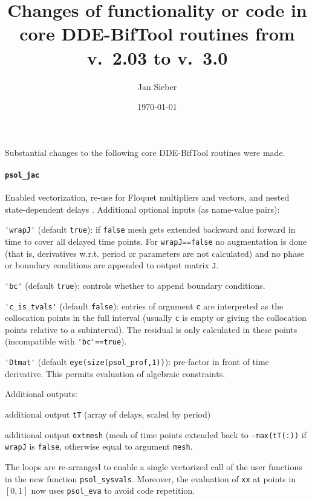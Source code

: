 \documentclass[11pt]{scrartcl}
\title{Changes of functionality or code in core DDE-BifTool
  routines from v.~2.03 to v.~3.0}
\author{Jan Sieber}\date{\today}
\newcommand{\mlvar}[1]{\lstinline[keywordstyle=\color{var}]!#1!}
\newcommand{\blist}[1]{\mbox{\lstinline!#1!}}
\begin{document}
\maketitle
Substantial changes to the following core DDE-BifTool
\cite{ELS01,ELR02,homoclinic,RS07,VLR08} routines were
made. %

\paragraph{\blist{psol_jac}}
Enabled vectorization, re-use for Floquet multipliers and vectors, and
nested state-dependent delays \cite{S13}. Additional optional inputs (as
name-value pairs):
\begin{compactitem}
\item \blist{'wrapJ'} (default \blist{true}): if \blist{false} mesh
  gets extended backward and forward in time to cover all delayed time
  points. For \blist{wrapJ==false} no augmentation is done (that is,
  derivatives w.r.t. period or parameters are not calculated) and no
  phase or boundary conditions are appended to output matrix
  \mlvar{J}.
\item \blist{'bc'} (default \blist{true}): controls whether to append
  boundary conditions.
\item \blist{'c_is_tvals'} (default \blist{false}): entries of
  argument \blist{c} are interpreted as the collocation points in the
  full interval (usually \blist{c} is empty or giving the collocation
  points relative to a subinterval). The residual is only calculated
  in these points (incompatible with \blist{'bc'==true}).
\item \blist{'Dtmat'} (default \blist{eye(size(psol_prof,1))}):
  pre-factor in front of time derivative. This permits evaluation of
  algebraic constraints.
\end{compactitem}
Additional outputs:
\begin{compactitem}
\item additional output \mlvar{tT} (array of delays, scaled by period)
\item additional output \mlvar{extmesh} (mesh of time points extended
  back to \blist{-max(tT(:))} if \blist{wrapJ} is \blist{false},
  otherwise equal to argument \blist{mesh}.
\end{compactitem}
The loops are re-arranged to enable a single vectorized call of the
user functions in the new function \mlvar{psol_sysvals}. Moreover, the
evaluation of \blist{xx} at points in $[0,1]$ now uses
\blist{psol_eva} to avoid code repetition.
\end{document}
